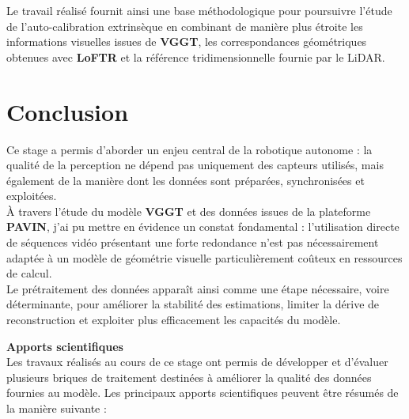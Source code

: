 \documentclass[12pt,a4paper,oneside]{report}
\begin{document}
\hspace*{.3cm}Le travail réalisé fournit ainsi une base méthodologique pour poursuivre l'étude de l'auto-calibration extrinsèque en combinant de manière plus étroite les informations visuelles issues de \textbf{VGGT}, les correspondances géométriques obtenues avec \textbf{LoFTR} et la référence tridimensionnelle fournie par le LiDAR.
\chapter*{Conclusion}

\hspace*{0.3cm}Ce stage a permis d'aborder un enjeu central de la robotique autonome : la qualité de la perception ne dépend pas uniquement des capteurs utilisés, mais également de la manière dont les données sont préparées, synchronisées et exploitées.\\
À travers l'étude du modèle \textbf{VGGT} et des données issues de la plateforme \textbf{PAVIN}, j'ai pu mettre en évidence un constat fondamental : l'utilisation directe de séquences vidéo présentant une forte redondance n'est pas nécessairement adaptée à un modèle de géométrie visuelle particulièrement coûteux en ressources de calcul.\\

\hspace*{.3cm}Le prétraitement des données apparaît ainsi comme une étape nécessaire, voire déterminante, pour améliorer la stabilité des estimations, limiter la dérive de reconstruction et exploiter plus efficacement les capacités du modèle.

\par\bigskip
\par\bigskip

\hspace*{0.4cm}\textbf{Apports scientifiques}\\

\hspace*{.3cm}Les travaux réalisés au cours de ce stage ont permis de développer et d'évaluer plusieurs briques de traitement destinées à améliorer la qualité des données fournies au modèle. Les principaux apports scientifiques peuvent être résumés de la manière suivante :
\end{document}
